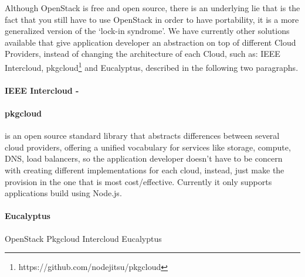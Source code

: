Although OpenStack is free and open source, there is an underlying lie that is the fact that you still have to use OpenStack in order to have portability, it is a more generalized version of the `lock-in syndrome'. We have currently other solutions available that give application developer an abstraction on top of different Cloud Providers, instead of changing the architecture of each Cloud, such as: IEEE Intercloud, pkgcloud\footnote{https://github.com/nodejitsu/pkgcloud} and Eucalyptus\cite{Nurmi2009}, described in the following two paragraphs.


\paragraph{\textbf{IEEE Intercloud -}} %
\label{par:IEEE Intercloud }



\paragraph{\textbf{pkgcloud }} %
\label{par:pkgcloud }

is an open source standard library that abstracts differences between several cloud providers, offering a unified vocabulary for services like storage, compute, DNS, load balancers, so the application developer doesn't have to be concern with creating different implementations for each cloud, instead, just make the provision in the one that is most cost/effective. Currently it only supports applications build using Node.js.



\paragraph{\textbf{Eucalyptus }} %
\label{par:Eucalyptus -}


OpenStack
Pkgcloud
Intercloud
Eucalyptus 







%  





